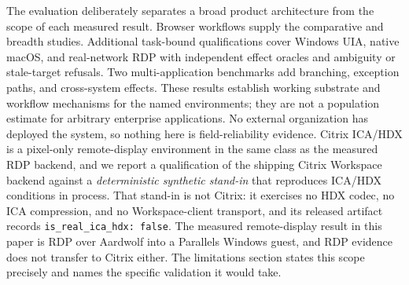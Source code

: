 The evaluation deliberately separates a broad product architecture from the
scope of each measured result. Browser workflows supply the comparative and
breadth studies. Additional task-bound qualifications cover Windows UIA,
native macOS, and real-network RDP with independent effect oracles and ambiguity
or stale-target refusals. Two multi-application benchmarks add branching,
exception paths, and cross-system effects. These results establish working
substrate and workflow mechanisms
for the named environments; they are not a population estimate for arbitrary
enterprise applications. No external organization has deployed the system, so
nothing here is field-reliability evidence.
Citrix ICA/HDX is a pixel-only remote-display
environment in the same class as the measured RDP backend, and we report a
qualification of the shipping Citrix Workspace backend against a
\emph{deterministic synthetic stand-in} that reproduces ICA/HDX conditions in
process. That stand-in is not Citrix: it exercises no HDX codec, no ICA
compression, and no Workspace-client transport, and its released artifact
records \texttt{is\_real\_ica\_hdx: false}. The measured remote-display result
in this paper is RDP over Aardwolf into a Parallels Windows guest, and RDP
evidence does not transfer to Citrix either.
The limitations section states this scope precisely and names the
specific validation it would take.
